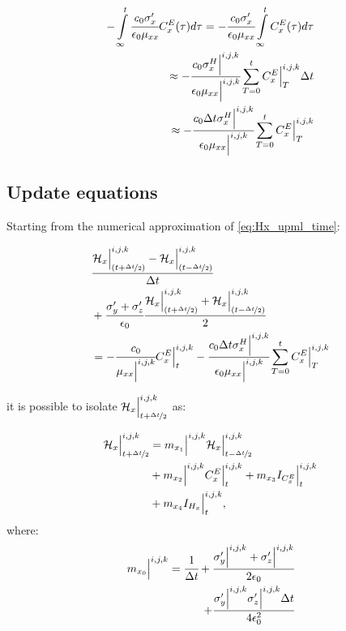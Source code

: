 \begin{align}
    - \int\limits_{\infty}^t\cfrac{c_0\sigma_x^{\prime}}{\epsilon_0\mu_{xx}}C_x^E(\tau)d\tau = - \cfrac{c_0\sigma_x^{\prime}}{\epsilon_0\mu_{xx}} \int\limits_{\infty}^tC_x^E(\tau)d\tau \nonumber \\
    \approx - \cfrac{c_0\sigma_x^H\Big|^{i,j,k}}{\epsilon_0\mu_{xx}\Big|^{i,j,k}} \sum\limits_{T=0}^{t}C_x^E\Big|^{i,j,k}_{T}\Delta t \nonumber \\
    \approx - \cfrac{c_0\Delta t\sigma_x^H\Big|^{i,j,k}}{\epsilon_0\mu_{xx}\Big|^{i,j,k}} \sum\limits_{T=0}^{t}C_x^E\Big|^{i,j,k}_{T}
\end{align}

\subsection{Update equations}

Starting from the numerical approximation of \eqref{eq:Hx_upml_time}:

\begin{small}
    \begin{align}
        &\cfrac{\mathcal{H}_x\Big|_{(t+\nicefrac{\Delta t}{2})}^{i,j,k}-\mathcal{H}_x\Big|^{i,j,k}_{(t-\nicefrac{\Delta t}{2})}}{\Delta t} \nonumber \\ 
        &+ \cfrac{\sigma_y^{\prime} + \sigma_z^{\prime}}{\epsilon_0}\cfrac{\mathcal{H}_x\Big|_{(t+\nicefrac{\Delta t}{2})}^{i,j,k}+\mathcal{H}_x\Big|^{i,j,k}_{(t-\nicefrac{\Delta t}{2})}}{2}  \nonumber \\
        &= -\cfrac{c_0}{\mu_{xx}\Big|^{i,j,k}}C_x^E\Big|^{i,j,k}_{t} - \cfrac{c_0\Delta t\sigma_x^H\Big|^{i,j,k}}{\epsilon_0\mu_{xx}\Big|^{i,j,k}} \sum\limits_{T=0}^{t}C_x^E\Big|^{i,j,k}_{T}
    \end{align}
\end{small}
it is possible to isolate $ \mathcal{H}_x\Big|_{t+\nicefrac{\Delta t}{2}}^{i,j,k}$ as:

\begin{align}
    \mathcal{H}_x\Big|_{t+\nicefrac{\Delta t}{2}}^{i,j,k} &= m_{{x_1}}\Big|^{i,j,k} \mathcal{H}_x\Big|_{t-\nicefrac{\Delta t}{2}}^{i,j,k} 
    \nonumber \\
    & + m_{{x_2}}\Big|^{i,j,k}C_x^E\Big|^{i,j,k}_{t} + m_{{x_3}} I_{C^E_x}\Big|^{i,j,k}_{t} 
    \nonumber \\
    &+ m_{{x_4}} I_{H_x}\Big|^{i,j,k}_{t},
\end{align}
where:
\begin{align}
    m_{{x_0}}\Big|^{i,j,k} = \cfrac{1}{\Delta t} + \cfrac{\sigma_y^{\prime}\Big|^{i,j,k} + \sigma_z^{\prime}\Big|^{i,j,k}}{2\epsilon_0} \nonumber\\ + \cfrac{\sigma_y^{\prime}\Big|^{i,j,k}  \sigma_z^{\prime}\Big|^{i,j,k} \Delta t}{4\epsilon_0^2}
\end{align}

